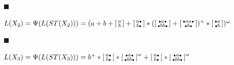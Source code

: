 \par\noindent  $\blacksquare$ 
 
$L(X_{2})=\Psi(L(ST(X_{2})))=(a+b+\left[\begin{smallmatrix}a\\
b\end{smallmatrix}\right]+\left[\begin{smallmatrix}a\vbox{\hbox{\tiny$\bullet$}}\\
b\vbox{\hbox{\tiny$\bullet$}}\end{smallmatrix}\right]*(\left[\begin{smallmatrix}\vbox{\hbox{\tiny$\bullet$}}a\vbox{\hbox{\tiny$\bullet$}}\\
\vbox{\hbox{\tiny$\bullet$}}bb\vbox{\hbox{\tiny$\bullet$}}\end{smallmatrix}\right]+\left[\begin{smallmatrix}\vbox{\hbox{\tiny$\bullet$}}aa\vbox{\hbox{\tiny$\bullet$}}\\
\vbox{\hbox{\tiny$\bullet$}}b\vbox{\hbox{\tiny$\bullet$}}\end{smallmatrix}\right])^{+}*\left[\begin{smallmatrix}\vbox{\hbox{\tiny$\bullet$}}a\\
\vbox{\hbox{\tiny$\bullet$}}b\end{smallmatrix}\right])^{\omega}$\par
 
 
 
\par\noindent  $\blacksquare$ 
 
$L(X_{3})=\Psi(L(ST(X_{3})))=b^{+}*\left[\begin{smallmatrix}a\vbox{\hbox{\tiny$\bullet$}}\\
b\vbox{\hbox{\tiny$\bullet$}}\end{smallmatrix}\right]*\left[\begin{smallmatrix}\vbox{\hbox{\tiny$\bullet$}}a\vbox{\hbox{\tiny$\bullet$}}\\
\vbox{\hbox{\tiny$\bullet$}}bb\vbox{\hbox{\tiny$\bullet$}}\end{smallmatrix}\right]^{\omega}+\left[\begin{smallmatrix}a\vbox{\hbox{\tiny$\bullet$}}\\
b\vbox{\hbox{\tiny$\bullet$}}\end{smallmatrix}\right]*\left[\begin{smallmatrix}\vbox{\hbox{\tiny$\bullet$}}a\vbox{\hbox{\tiny$\bullet$}}\\
\vbox{\hbox{\tiny$\bullet$}}bb\vbox{\hbox{\tiny$\bullet$}}\end{smallmatrix}\right]^{\omega}$\par
 
